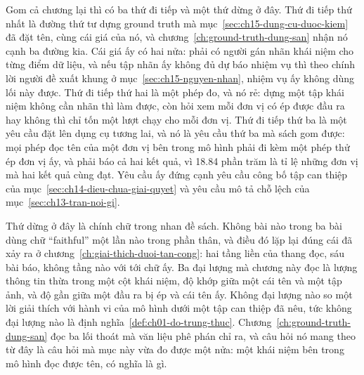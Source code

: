 %
%
Gom cả chương lại thì có ba thứ đi tiếp và một thứ dừng ở đây. Thứ đi tiếp thứ
nhất là đường thứ tư dựng ground truth mà
mục~\ref{sec:ch15-dung-cu-duoc-kiem} đã đặt tên, cùng cái giá của nó, và
chương~\ref{ch:ground-truth-dung-san} nhận nó cạnh ba đường kia. Cái giá ấy có
hai nửa: phải có người gán nhãn khái niệm cho từng điểm dữ liệu, và nếu tập nhãn
ấy không đủ dự báo nhiệm vụ thì theo chính lời người đề xuất khung ở
mục~\ref{sec:ch15-nguyen-nhan}, nhiệm vụ ấy không dùng lối này được. Thứ đi tiếp
thứ hai là một phép đo, và nó rẻ: dựng một tập khái niệm không cần nhãn thì làm
được, còn hỏi xem mỗi đơn vị có ép được đầu ra hay không thì chỉ tốn một lượt
chạy cho mỗi đơn vị. Thứ đi tiếp thứ ba là một yêu cầu đặt lên dụng cụ tương
lai, và nó là yêu cầu thứ ba mà sách gom được: mọi phép đọc tên của một đơn vị
bên trong mô hình phải đi kèm một phép thử ép đơn vị ấy, và phải báo cả hai kết
quả, vì 18.84 phần trăm là tỉ lệ những đơn vị mà hai kết quả cùng đạt. Yêu cầu
ấy đứng cạnh yêu cầu công bố tập can thiệp của
mục~\ref{sec:ch14-dieu-chua-giai-quyet} và yêu cầu mô tả chỗ lệch của
mục~\ref{sec:ch13-tran-noi-gi}.

Thứ dừng ở đây là chính chữ trong nhan đề sách. Không bài nào trong ba bài dùng
chữ \enquote{faithful} một lần nào trong phần thân, và điều đó lặp lại đúng cái
đã xảy ra ở chương~\ref{ch:giai-thich-duoi-tan-cong}: hai tầng liền của thang
đọc, sáu bài báo, không tầng nào với tới chữ ấy. Ba đại lượng mà chương này đọc
là lượng thông tin thừa trong một cột khái niệm, độ khớp giữa một cái tên và một
tập ảnh, và độ gần giữa một đầu ra bị ép và cái tên ấy. Không đại lượng nào so
một lời giải thích với hành vi của mô hình dưới một tập can thiệp đã nêu, tức
không đại lượng nào là định nghĩa~\ref{def:ch01-do-trung-thuc}.
Chương~\ref{ch:ground-truth-dung-san} đọc ba lối thoát mà văn liệu phê phán chỉ
ra, và câu hỏi nó mang theo từ đây là câu hỏi mà mục này vừa đo được một nửa:
một khái niệm bên trong mô hình đọc được tên, có nghĩa là gì.
